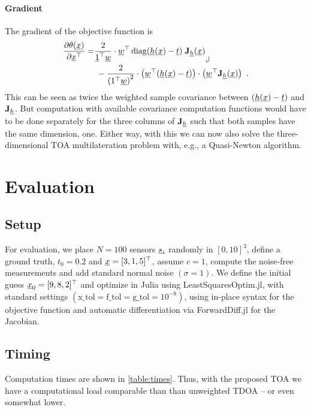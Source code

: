 \documentclass[conference]{IEEEtran}
\begin{document}
%
%
\paragraph*{Gradient}
The gradient of the objective function is 
\begin{align}
    \frac{\partial \theta(\x)}{\partial \x\T} =& \frac{2}{\vec 1\T \w} \cdot \w\T \diag(\vec h(\x)-\t) \;  \mat J_{\vec h}(\x)
    \text{\raisebox{-.7\baselineskip}[0pt][0pt]{\rotatebox[origin=c]{180}{$\Rsh$}}}  \\
    & \; - \frac{2}{{\paren{1\T \w}}^2} \cdot \paren{\w\T \paren{\vec h(\x)-\t}} \cdot \paren{\w\T  \mat J_{\vec h}(\x) } \enspace. 
\end{align}
This can be seen as twice the weighted sample covariance between $(\underline{h}({\underline{x}})-{\underline{t}})$ and ${\mathbf J}_{\underline{h}}$. But computation with available covariance computation functions would have to be done separately for the three columns of ${\mathbf J}_{\underline{h}}$ such that both samples have the same dimension, one. Either way, with this we can now also solve the three-dimensional \ac{TOA} multilateration problem with, e.g., a Quasi-Newton algorithm. 


%
%
\section{Evaluation} 
%
%
\subsection{Setup} 
\label{sec:eval:setup}
For evaluation, we place $N=100$ sensors ${\underline{s}}_i$ randomly in $[0,10]^3$, define a ground truth, $t_0=0.2$ and ${\underline{x}}=[3,1,5]^\top$, assume $c=1$, compute the noise-free measurements and add standard normal noise $(\sigma=1)$. We define the initial guess ${\underline{x}}_0=[9,8,2]^\top$ and optimize in Julia using LeastSquaresOptim.jl, with standard settings $(\text{x\_tol}=\text{f\_tol}=\text{g\_tol}=10^{-8})$, using in-place syntax for the objective function and automatic differentiation via ForwardDiff.jl 
\cite{Revels2016_ForwardModeAutomaticDifferentiationInJulia} for the Jacobian. 
%
%
\subsection{Timing} 
Computation times are shown in \cref{table:times}. Thus, with the proposed \ac{TOA} we have a computational load comparable than than unweighted \ac{TDOA} -- or even somewhat lower. 
\end{document}
